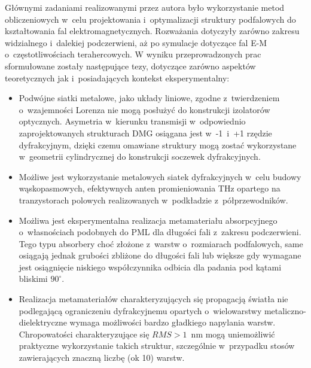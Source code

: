 Głównymi zadaniami realizowanymi przez autora było wykorzystanie metod obliczeniowych w~celu projektowania i~optymalizacji struktury podfalowych do kształtowania fal elektromagnetycznych. Rozważania dotyczyły zarówno zakresu widzialnego i~dalekiej podczerwieni, aż po symulacje dotyczące fal E-M o~częstotliwościach terahercowych. W wyniku przeprowadzonych prac sformułowane zostały następujące tezy, dotyczące zarówno aspektów teoretycznych jak i~posiadających kontekst eksperymentalny:
\begin{itemize}

\item Podwójne siatki metalowe, jako układy liniowe, zgodne z~twierdzeniem o~wzajemności Lorenza nie mogą posłużyć do konstrukcji izolatorów optycznych. Asymetria w~kierunku transmisji w~odpowiednio zaprojektowanych strukturach DMG osiągana jest w~-1~i~+1 rzędzie dyfrakcyjnym, dzięki czemu omawiane struktury mogą zostać wykorzystane w~geometrii cylindrycznej do konstrukcji soczewek dyfrakcyjnych.

\item Możliwe jest wykorzystanie metalowych siatek dyfrakcyjnych w~celu budowy wąskopasmowych, efektywnych anten promieniowania THz opartego na tranzystorach polowych realizowanych w~podkładzie z~półprzewodników. 

\item Możliwa jest eksperymentalna realizacja metamateriału absorpcyjnego o~własnościach podobnych do PML dla długości fali z~zakresu podczerwieni. Tego typu absorbery choć złożone z~warstw o~rozmiarach podfalowych, same osiągają jednak grubości zbliżone do długości fali lub większe gdy wymagane jest osiągnięcie niskiego współczynnika odbicia dla padania pod kątami bliskimi $90^{\circ}$.

\item Realizacja metamateriałów charakteryzujących się propagacją światła nie podlegającą ograniczeniu dyfrakcyjnemu opartych o~wielowarstwy metaliczno-dielektryczne wymaga możliwości bardzo gładkiego napylania warstw. Chropowatości charakteryzujące się $RMS>1$~nm mogą uniemożliwić praktyczne wykorzystanie takich struktur, szczególnie w~przypadku stosów zawierających znaczną liczbę (ok 10) warstw.
\end{itemize}
